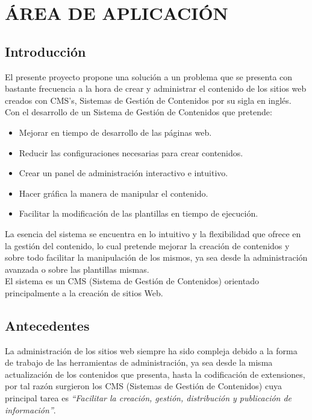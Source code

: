 
\chapter{\'AREA DE APLICACI\'ON}
\newpage
\section{Introducci\'on}

El presente proyecto propone una soluci\'on a un problema que se presenta con bastante frecuencia a la hora de crear y administrar el contenido de los sitios web creados con CMS's, Sistemas de Gesti\'on de Contenidos por su sigla en ingl\'es.\\
Con el desarrollo de un Sistema de Gesti\'on de Contenidos que pretende:

\begin{itemize}
\item Mejorar en tiempo de desarrollo de las p\'aginas web.
\item Reducir las configuraciones necesarias para crear contenidos.
\item Crear un panel de administraci\'on interactivo e intuitivo.
\item Hacer gr\'afica la manera de manipular el contenido.
\item Facilitar la modificaci\'on de las plantillas en tiempo de ejecuci\'on.
\end{itemize}

La esencia del sistema se encuentra en lo intuitivo y la flexibilidad que ofrece en la gesti\'on del contenido, lo cual pretende mejorar la creaci\'on de contenidos y sobre todo facilitar la manipulaci\'on de los mismos, ya sea desde la administraci\'on avanzada o sobre las plantillas mismas.\\
El sistema es un CMS (Sistema de Gesti\'on de Contenidos) orientado principalmente a la creaci\'on de sitios Web.

\section{Antecedentes}
La administraci\'on de los sitios web siempre ha sido compleja debido a la forma de trabajo de las herramientas de administraci\'on, ya sea desde la misma actualizaci\'on de los contenidos que presenta, hasta la codificaci\'on de extensiones, por tal raz\'on surgieron los CMS (Sistemas de Gesti\'on de Contenidos) cuya principal tarea es  \textit{``Facilitar la creaci\'on, gesti\'on, distribuci\'on y publicaci\'on de informaci\'on''}.\\

